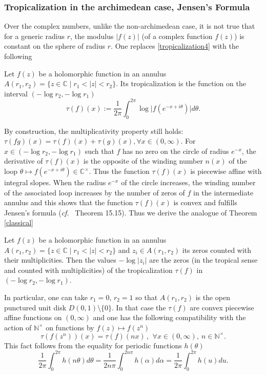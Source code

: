 \documentclass[graybox, envcountsect%
]{svmult}
\def\C{{\mathbb C}}
\def\N{{\mathbb N}}
\def\qqq{\,,\,~\forall}
\newcommand{\cf}{{\it cf.}}
\def\no{\noindent}
\def\nt{\N^{\times}}
\begin{document}
\subsubsection{Tropicalization in the archimedean case, Jensen's Formula}\label{subsubsec:3.2.2}

Over the complex numbers, unlike the non-archimedean case, it is not true that for a generic radius $r$, the modulus  $\vert f(z)\vert$ (of a complex function $f(z)$) is constant on the sphere of radius $r$. One replaces \eqref{tropicalization4} with the following

\begin{definition}\label{defntrop} Let $f(z)$ be a holomorphic function in an annulus  $A(r_1,r_2)= \{z\in \C\mid r_1<\vert z\vert <r_2\}$. Its tropicalization is the function on the interval $(-\log r_2, -\log r_1)$
\begin{equation*}\label{tropicalization4bis}
\tau(f)(x):=\frac{1}{2 \pi}\int_0^{2\pi} \log\vert f(e^{-x+i\theta})\vert d\theta.
\end{equation*}	
\end{definition}

 \no By construction, the multiplicativity property still holds:
$
\tau(fg)(x)=\tau(f)(x)+\tau(g)(x), \forall x\in (0, \infty)$.\newline
For $x\in (-\log r_2, -\log r_1)$ such that $f$ has no zero on the circle of radius $e^{-x}$, the derivative of $\tau(f)(x)$ is the opposite of the winding number $n(x)$ of the loop $\theta\mapsto f(e^{-x+i\theta})\in \C^\times$. Thus the function $\tau(f)(x)$ is piecewise affine with integral slopes. When the radius $e^{-x}$ of the circle increases, the winding number of the associated loop increases by the number of zeros of $f$ in the intermediate annulus and this shows that the function $\tau(f)(x)$ is convex and fulfills Jensen's formula (\cf~\cite{Rudin} Theorem 15.15). Thus we derive the analogue of Theorem \ref{classical} 

\begin{theorem}\label{classical1} Let $f(z)$ be a holomorphic function in an annulus  $A(r_1,r_2)= \{z\in \C\mid r_1<\vert z\vert <r_2\}$ and $z_i\in A(r_1,r_2)$ its zeros counted with their multiplicities. Then the values $-\log\vert z_i\vert$  are the zeros (in the tropical sense and counted with multiplicities) of the tropicalization $\tau(f)$ in $(-\log r_2, -\log r_1)$.
\end{theorem}
  
\no In particular, one can take $r_1=0$, $r_2=1$ so that $A(r_1,r_2)$ is the open punctured unit  disk $D(0,1)\setminus \{0\}$. In that case the $\tau(f)$ are convex piecewise affine functions on $(0,\infty)$ and 
  one has the following compatibility with the action of $\nt$ on functions by $f(z)\mapsto f(z^n)$ 
\begin{equation}\label{tropicalizationscalbis}
\tau(f(z^n))(x)=\tau(f)(nx)\qqq x\in (0, \infty),\ n\in \nt.
\end{equation}
This fact follows from the equality for periodic functions $h(\theta)$
$$
\frac{1}{2 \pi}\int_0^{2\pi}h(n\theta) d\theta=\frac{1}{2 n\pi}\int_0^{2n\pi}h(\alpha)d\alpha=\frac{1}{2 \pi}\int_0^{2\pi}h(u)du.
$$
\end{document}
